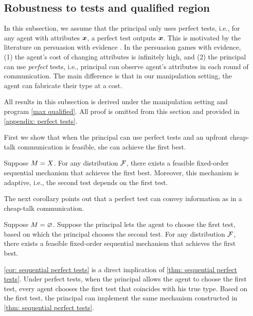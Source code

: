 \subsection{Robustness to tests and qualified region}\label{sec: perfect tests}

In this subsection, we assume that the principal only uses perfect tests, i.e., for any agent with attributes $\boldsymbol{x}$, a perfect test outputs $\boldsymbol{x}$.
This is motivated by the literature on persuasion with evidence \citep{glazer2004optimal,sher2014persuasion}.
In the persuasion games with evidence, (1) the agent's cost of changing attributes is infinitely high, and (2) the principal can use \emph{perfect} tests, i.e., principal can observe agent's attributes in each round of communication.
The main difference is that in our manipulation setting, the agent can fabricate their type at a cost.

All results in this subsection is derived under the manipulation setting and program \ref{max qualified}.
All proof is omitted from this section and provided in \cref{appendix: perfect tests}.

First we show that when the principal can use perfect tests and an upfront cheap-talk communication is feasible, she can achieve the first best.

\begin{proposition}\label{thm: sequential perfect tests}
Suppose $M=X$.
     For any distribution $\mathcal{F}$, there exists a feasible fixed-order sequential mechanism that achieves the first best.   
     Moreover, this mechanism is adaptive, i.e., the second test depends on the first test.
\end{proposition}


The next corollary points out that a perfect test can convey information as in a cheap-talk communication. 

\begin{corollary}\label{cor: sequential perfect tests}
Suppose $M=\varnothing$.
     Suppose the principal lets the agent to choose the first test, based on which the principal chooses the second test. For any distribution $\mathcal{F}$, there exists a feasible fixed-order sequential mechanism that achieves the first best.   
\end{corollary}

 \cref{cor: sequential perfect tests} is a direct implication of \cref{thm: sequential perfect tests}. Under perfect tests, when the principal allows the agent to choose the first test, every agent chooses the first test that coincides with his true type.
 Based on the first test, the principal 
 can implement the same mechanism constructed in \cref{thm: sequential perfect tests}.
 
